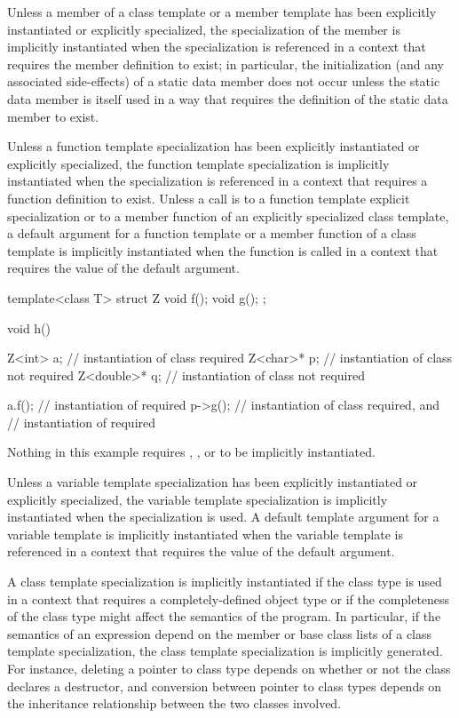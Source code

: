 \pnum
Unless a member of a class template or a member template has been explicitly
instantiated or explicitly specialized,
the specialization of the member is implicitly instantiated when the
specialization is referenced in a context that requires the member definition
to exist;
in particular, the initialization (and any associated side-effects) of a
static data member does not occur unless the static data member is itself used
in a way that requires the definition of the static data member to exist.

\pnum
Unless a function template specialization has been explicitly instantiated or
explicitly specialized,
the function template specialization is implicitly instantiated when the
specialization is referenced in a context that requires a function definition
to exist.
Unless a call is to a function template explicit specialization or
to a member function of an explicitly specialized class template,
a default argument for a function template or a member function of a
class template is implicitly instantiated when the function is
called in a context that requires the value of the default argument.

\pnum
\enterexample
\begin{codeblock}
template<class T> struct Z {
  void f();
  void g();
};

void h() {
  Z<int> a;         // instantiation of class  required
  Z<char>* p;       // instantiation of class  not required
  Z<double>* q;     // instantiation of class  not required

  a.f();            // instantiation of  required
  p->g();           // instantiation of class  required, and
                    // instantiation of  required
}
\end{codeblock}

Nothing in this example requires
,
,
or
to be implicitly instantiated.
\exitexample

\pnum
Unless a variable template specialization has been explicitly instantiated or
explicitly specialized, the variable template specialization is implicitly
instantiated when the specialization is used. A default template argument for a
variable template is implicitly instantiated when the variable template is
referenced in a context that requires the value of the default argument.

\pnum
A class template specialization is implicitly instantiated if the
class type is used in a context that requires a completely-defined
object type or if the completeness of the class type might affect the
semantics of the program.
\enternote
In particular, if the semantics of an expression depend on the member
or base class lists of a class template specialization, the class
template specialization is implicitly generated. For instance,
deleting a pointer to class type depends on whether or not the class
declares a destructor, and conversion between pointer to class types
depends on the inheritance relationship between the two classes
involved.
\exitnote
\enterexample

